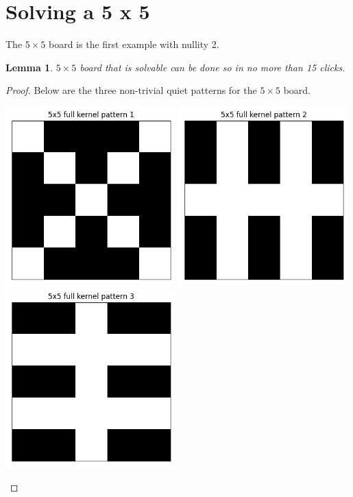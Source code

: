 \documentclass{article}
\newtheorem{lemma}{Lemma}
\begin{document}
	\section{Solving a 5 x 5}
	The $5 \times 5$ board is the first example with nullity 2.
	\begin{lemma}
		$5 \times 5$ board that is solvable can be done so in no more than 15 clicks.
	\end{lemma}
	\begin{proof}
		Below are the three non-trivial quiet patterns for the $5 \times 5$ board.
		\begin{center}
			\includegraphics[width=0.49\textwidth]{../code/serialization/kernels/5x5/full/5x5_kernel_full_1.png}
			\includegraphics[width=0.49\textwidth]{../code/serialization/kernels/5x5/full/5x5_kernel_full_2.png}
			\includegraphics[width=0.49\textwidth]{../code/serialization/kernels/5x5/full/5x5_kernel_full_3.png}

\end{center}
\end{proof}
\end{document}
